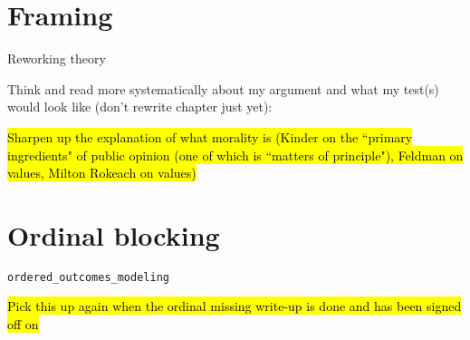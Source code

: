 \section*{Framing}
	\begin{coi}
		\item Reworking theory
			\begin{coi}
				\item Think and read more systematically about my argument and what my test(s) would look like (don't rewrite chapter just yet):
						\begin{coi}
							\item \hl{Sharpen up the explanation of what morality is (Kinder on the ``primary ingredients" of public opinion (one of which is ``matters of principle"), Feldman on values, Milton Rokeach on values)}
						\end{coi}
			\end{coi}
	\end{coi} 

\section*{Ordinal blocking}
	\begin{coi}
		\item \texttt{ordered\_outcomes\_modeling}
			\begin{coi}
				\item \hl{Pick this up again when the ordinal missing write-up is done and has been signed off on}
			\end{coi}
	\end{coi}
	

	




